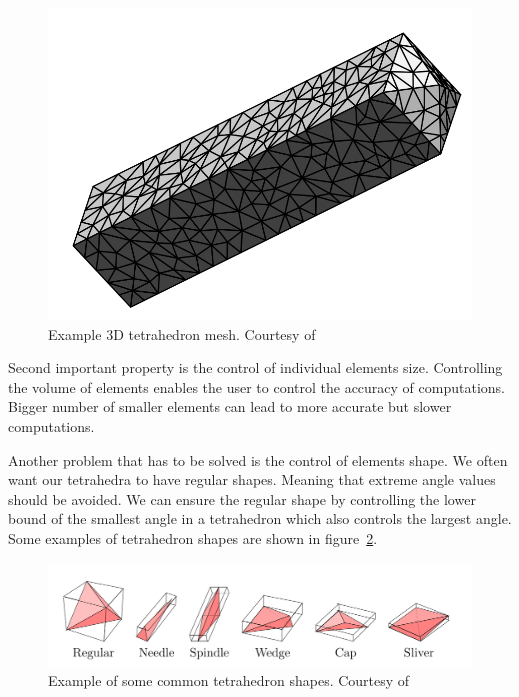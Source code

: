 \documentclass[en]{minipw} %
\begin{document}
\begin{figure}[h!]
\centering
\includegraphics[scale=0.3]{pictures/3dmesh.png}
\caption[Fine tetrahedron mesh]{Example 3D tetrahedron mesh. Courtesy of~\cite{delaunay_mesh}}
\label{fig:mesh_complete}
\end{figure}

Second important property is the control of individual elements size. Controlling the volume of elements enables the user to control the accuracy of computations. Bigger number of smaller elements can lead to more accurate but slower computations.

Another problem that has to be solved is the control of elements shape. We often want our tetrahedra to have regular shapes. Meaning that extreme angle values should be avoided. We can ensure the regular shape by controlling the lower bound of the smallest angle in a tetrahedron which also controls the largest angle. Some examples of tetrahedron shapes are shown in figure~\ref{fig:tetrahedra_shapes}.

\begin{figure}[h!]
\centering
\includegraphics[scale=0.3]{pictures/tetrahedra_shapes.png}
\caption[Tetrahedron shapes]{Example of some common tetrahedron shapes. Courtesy of~\cite{tetgen}}
\label{fig:tetrahedra_shapes}
\end{figure}
\end{document}

